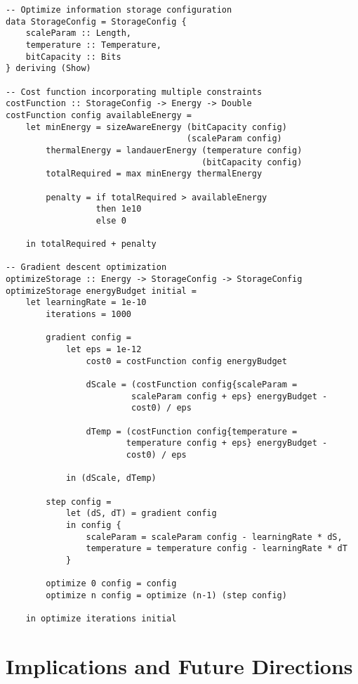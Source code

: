 \documentclass[11pt,a4paper]{article}
\theoremstyle{definition}
\begin{document}
\begin{lstlisting}
-- Optimize information storage configuration
data StorageConfig = StorageConfig {
    scaleParam :: Length,
    temperature :: Temperature,
    bitCapacity :: Bits
} deriving (Show)

-- Cost function incorporating multiple constraints
costFunction :: StorageConfig -> Energy -> Double
costFunction config availableEnergy =
    let minEnergy = sizeAwareEnergy (bitCapacity config) 
                                    (scaleParam config)
        thermalEnergy = landauerEnergy (temperature config) 
                                       (bitCapacity config)
        totalRequired = max minEnergy thermalEnergy
        
        penalty = if totalRequired > availableEnergy 
                  then 1e10 
                  else 0
                  
    in totalRequired + penalty

-- Gradient descent optimization
optimizeStorage :: Energy -> StorageConfig -> StorageConfig
optimizeStorage energyBudget initial =
    let learningRate = 1e-10
        iterations = 1000
        
        gradient config =
            let eps = 1e-12
                cost0 = costFunction config energyBudget
                
                dScale = (costFunction config{scaleParam = 
                         scaleParam config + eps} energyBudget - 
                         cost0) / eps
                         
                dTemp = (costFunction config{temperature = 
                        temperature config + eps} energyBudget - 
                        cost0) / eps
                        
            in (dScale, dTemp)
        
        step config = 
            let (dS, dT) = gradient config
            in config {
                scaleParam = scaleParam config - learningRate * dS,
                temperature = temperature config - learningRate * dT
            }
        
        optimize 0 config = config
        optimize n config = optimize (n-1) (step config)
        
    in optimize iterations initial
\end{lstlisting}

\section{Implications and Future Directions}
\end{document}
